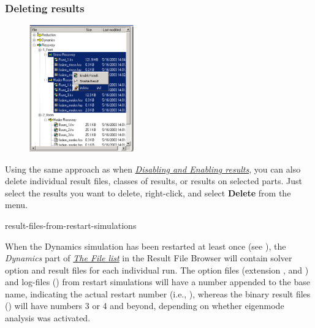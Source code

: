 
\subsubsection{Deleting results}

\begin{figure}
  \vspace{-5mm}
  \includegraphics[width=0.4\textwidth]{Figures/RFB-delete}
\end{figure}

Using the same approach as when
\protect\hyperlink{disabling-and-enabling}{\sl Disabling and Enabling results},
you can also delete individual result files, classes of results,
or results on selected parts. Just select the results you want to delete,
right-click, and select \textbf{Delete} from the menu.




           {result-files-from-restart-simulations}

When the Dynamics simulation has been restarted at least once
(see ),
the {\sl Dynamics} part of \protect\hyperlink{the-file-list}{\sl The File list}
in the Result File Browser will contain solver option and result files for each
individual run. The option files (extension ,  and
) and log-files () from restart simulations will
have a number appended to the base name, indicating the actual restart number
(i.e., ), whereas the binary result files
() will have numbers 3 or 4 and beyond, depending on whether
eigenmode analysis was activated.

